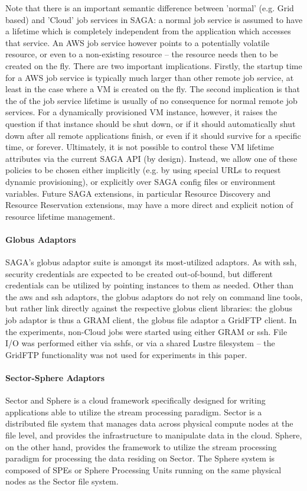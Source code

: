 \documentclass[3p,twocolumn]{elsarticle}
\begin{document}
Note that there is an important semantic difference between 'normal'
(e.g. Grid based) and 'Cloud' job services in SAGA: a normal job
service is assumed to have a lifetime which is completely independent
from the application which accesses that service.  An AWS job service
however points to a potentially volatile resource, or even to a
non-existing resource -- the resource needs then to be created on the
fly.  There are two important implications.  Firstly, the startup time
for a AWS job service is typically much larger than other remote job
service, at least in the case where a VM is created on the fly.  The
second implication is that the  of the job service lifetime is
usually of no consequence for normal remote job services.  For a
dynamically provisioned VM instance, however, it raises the question
if that instance should be shut down, or if it should automatically
shut down after all remote applications finish, or even if it should
survive for a specific time, or forever.  Ultimately, it is not
possible to control these VM lifetime attributes via the current SAGA
API (by design).  Instead, we allow one of these policies to be chosen
either implicitly (e.g. by using special URLs to request dynamic
provisioning), or explicitly over SAGA config files or environment
variables.  Future SAGA extensions, in particular Resource Discovery
and Resource Reservation extensions, may have a more direct and
explicit notion of resource lifetime management.


\paragraph{Globus Adaptors}

SAGA's globus adaptor suite is amongst its most-utilized adaptors.  As
with ssh, security credentials are expected to be created
out-of-bound, but different credentials can be utilized by pointing
 instances to them as needed.  Other than the aws and
ssh adaptors, the globus adaptors do not rely on command line tools,
but rather link directly against the respective globus client
libraries: the globus job adaptor is thus a GRAM client, the globus
file adaptor a GridFTP client.  In the experiments, non-Cloud jobs
were started using either GRAM or ssh.  File I/O was performed either
via sshfs, or via a shared Lustre filesystem -- the GridFTP
functionality was not used for experiments in this paper.

\paragraph{Sector-Sphere Adaptors}
Sector and Sphere is a cloud framework specifically designed for
writing applications able to utilize the stream processing
paradigm. Sector is a distributed file system that manages data across
physical compute nodes at the file level, and provides the
infrastructure to manipulate data in the cloud. Sphere, on the other
hand, provides the framework to utilize the stream processing paradigm
for processing the data residing on Sector. The Sphere system is
composed of SPEs or Sphere Processing Units running on the same
physical nodes as the Sector file system.
\end{document}
